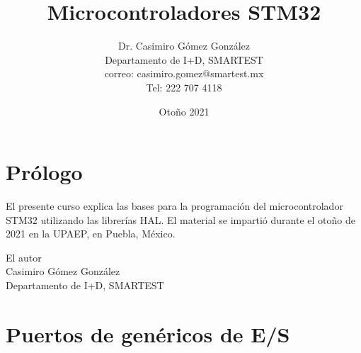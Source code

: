 \documentclass[12pt]{book}
\title{Microcontroladores STM32}
\author{Dr. Casimiro Gómez González\\
	Departamento de I+D, SMARTEST\\
               correo: casimiro.gomez@smartest.mx\\
               Tel: 222 707 4118}
\date{Otoño 2021}
\theoremstyle{definition}
\theoremstyle{remark}
\theoremstyle{plain}
\begin{document}
\frontmatter
\maketitle


\chapter{Prólogo}

El presente curso explica las bases para la programación del microcontrolador STM32 utilizando las librerías HAL. El material se impartió durante el otoño de 2021 en la UPAEP, en Puebla, México.

\begin{flushright}

El autor\\
Casimiro Gómez González\\
Departamento de I+D, SMARTEST
\end{flushright}

\tableofcontents

\mainmatter


\chapter{Puertos de genéricos de E/S}


\backmatter
\end{document}
